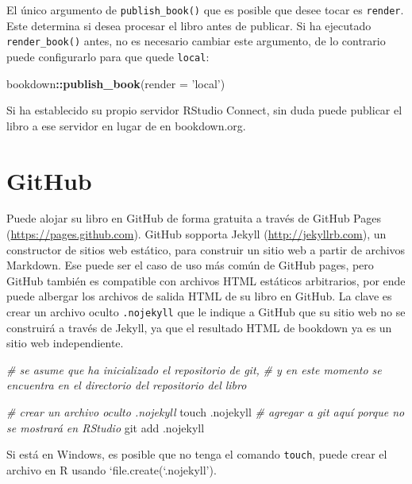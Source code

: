 \documentclass[12pt,]{krantz}
\makeatletter
\newenvironment{Shaded}{\begin{snugshade}}{\end{snugshade}}
\newcommand{\KeywordTok}[1]{\textcolor[rgb]{0.13,0.29,0.53}{\textbf{#1}}}
\newcommand{\DataTypeTok}[1]{\textcolor[rgb]{0.13,0.29,0.53}{#1}}
\newcommand{\StringTok}[1]{\textcolor[rgb]{0.31,0.60,0.02}{#1}}
\newcommand{\CommentTok}[1]{\textcolor[rgb]{0.56,0.35,0.01}{\textit{#1}}}
\newcommand{\FunctionTok}[1]{\textcolor[rgb]{0.00,0.00,0.00}{#1}}
\newcommand{\OperatorTok}[1]{\textcolor[rgb]{0.81,0.36,0.00}{\textbf{#1}}}
\newcommand{\NormalTok}[1]{#1}
\newenvironment{kframe}{%
\medskip{}
\setlength{\fboxsep}{.8em}
 \def\at@end@of@kframe{}%
 \ifinner\ifhmode%
  \def\at@end@of@kframe{\end{minipage}}%
  \begin{minipage}{\columnwidth}%
 \fi\fi%
 \def\FrameCommand##1{\hskip\@totalleftmargin \hskip-\fboxsep
 \colorbox{shadecolor}{##1}\hskip-\fboxsep
     \hskip-\linewidth \hskip-\@totalleftmargin \hskip\columnwidth}%
 \MakeFramed {\advance\hsize-\width
   \@totalleftmargin\z@ \linewidth\hsize
   \@setminipage}}%
 {\par\unskip\endMakeFramed%
 \at@end@of@kframe}
\renewenvironment{Shaded}{\begin{kframe}}{\end{kframe}}
\theoremstyle{definition}
\theoremstyle{definition}
\theoremstyle{definition}
\theoremstyle{remark}
\makeatother
\begin{document}
El único argumento de \texttt{publish\_book()} que es posible que desee
tocar es \texttt{render}. Este determina si desea procesar el libro
antes de publicar. Si ha ejecutado \texttt{render\_book()} antes, no es
necesario cambiar este argumento, de lo contrario puede configurarlo
para que quede \texttt{\textquotesingle{}local\textquotesingle{}}:

\begin{Shaded}
\begin{Highlighting}[]
\NormalTok{bookdown}\OperatorTok{::}\KeywordTok{publish_book}\NormalTok{(}\DataTypeTok{render =} \StringTok{'local'}\NormalTok{)}
\end{Highlighting}
\end{Shaded}

Si ha establecido su propio servidor RStudio Connect, sin duda puede
publicar el libro a ese servidor en lugar de en bookdown.org.

\section{GitHub}\label{github}

Puede alojar su libro en GitHub  de forma gratuita a
través de GitHub Pages (\url{https://pages.github.com}). GitHub sopporta
Jekyll (\url{http://jekyllrb.com}), un constructor de sitios web
estático, para construir un sitio web a partir de archivos Markdown. Ese
puede ser el caso de uso más común de GitHub pages, pero GitHub también
es compatible con archivos HTML estáticos arbitrarios, por ende puede
albergar los archivos de salida HTML de su libro en GitHub. La clave es
crear un archivo oculto \texttt{.nojekyll} que le indique a GitHub que
su sitio web no se construirá a través de Jekyll, ya que el resultado
HTML de bookdown ya es un sitio web independiente.

\begin{Shaded}
\begin{Highlighting}[]
\CommentTok{# se asume que ha inicializado el repositorio de git,}
\CommentTok{# y en este momento se encuentra en el directorio del repositorio del libro}

\CommentTok{# crear un archivo oculto .nojekyll}
\FunctionTok{touch}\NormalTok{ .nojekyll}
\CommentTok{# agregar a git aquí porque no se mostrará en RStudio}
\FunctionTok{git}\NormalTok{ add .nojekyll}
\end{Highlighting}
\end{Shaded}

Si está en Windows, es posible que no tenga el comando \texttt{touch},
puede crear el archivo en R usando `file.create(`.nojekyll').
\end{document}
